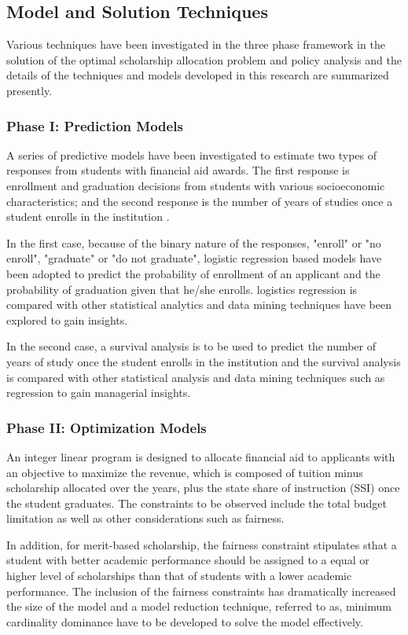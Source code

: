 \documentclass[12pt,english]{report}
\begin{document}
\subsection{Model and Solution Techniques}
Various techniques have been investigated in the three phase framework in the
solution of the optimal scholarship allocation problem and policy analysis and
the details of the techniques and models developed in this research are
summarized presently.

\subsubsection{Phase I: Prediction Models}
A series of predictive models have been investigated to estimate two types of
responses from students with financial aid awards. The first response is
enrollment and graduation decisions from students with various socioeconomic
characteristics;  and the second response is the number of years of studies
once a student enrolls in the institution .

In the first case,  because of the binary nature of the responses,  "enroll" or
"no enroll",  "graduate" or "do not graduate", logistic regression based models
have been adopted to predict the probability of enrollment of an applicant and
the probability of graduation given that he/she enrolls.   logistics regression
is compared with other statistical analytics and data mining techniques have
been explored to gain insights.

In the second case, a survival analysis is to be used to predict the number of
years of study once the student enrolls in the institution and the survival
analysis is compared with other statistical analysis and data mining
techniques such as regression to gain managerial insights.

\subsubsection{Phase II: Optimization Models}
An integer linear program is designed to allocate financial aid to applicants
with an objective to maximize the revenue, which is composed of tuition minus
scholarship allocated over the years, plus the state share of instruction (SSI)
once the student graduates.  The constraints to be observed include the total
budget limitation as well as other considerations such as fairness.

In addition, for merit-based scholarship, the fairness constraint stipulates
sthat a student with better academic performance should be assigned to a equal
or higher level of scholarships than that of students with a lower academic
performance. The inclusion of the fairness constraints has dramatically
increased the size of the model and a model reduction technique, referred to
as, minimum cardinality dominance have to be developed to solve the model
effectively.
\end{document}
